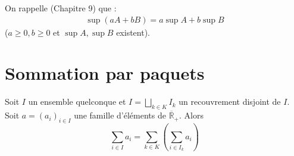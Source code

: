 \documentclass[../main.tex]{subfiles}
\begin{document}
\noindent On rappelle (Chapitre 9) que : 
\begin{align*}
    \sup(aA + bB) = a\sup A + b\sup B
\end{align*}
($a\geq 0, b\geq 0$ et $\sup A, \sup B$ existent). 

\section{Sommation par paquets}
\begin{tcolorbox}[title=Théorème 35.14, title filled=false, colframe=orange, colback=orange!10!white]
    Soit $I$ un ensemble quelconque et $I=\bigsqcup\limits_{k \in K} I_k$ un recouvrement disjoint de $I$. Soit $a=\left(a_i\right)_{i \in I}$ une famille d'éléments de $\overline{\mathbb{R}}_{+}$. Alors
    $$\sum_{i \in I} a_i=\sum_{k \in K}\left(\sum_{i \in I_k} a_i\right)$$
\end{tcolorbox}
\end{document}
